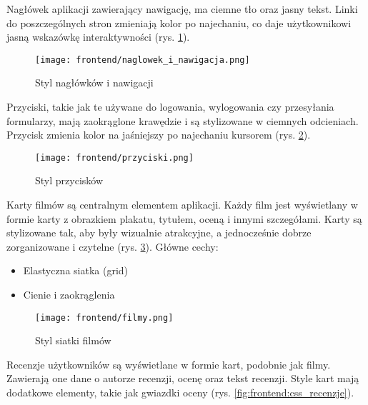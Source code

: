 \documentclass[../main.tex]{subfiles}
\begin{document}

Nagłówek aplikacji zawierający nawigację, ma ciemne tło oraz jasny tekst. Linki do poszczególnych stron zmieniają kolor po najechaniu, co daje użytkownikowi jasną wskazówkę interaktywności (rys. \ref{fig:frontend:css_navbar}).

\begin{figure}[htb]
	\centering
	\texttt{[image: frontend/naglowek\_i\_nawigacja.png]}
	\caption{Styl nagłówków i nawigacji}
	\label{fig:frontend:css_navbar}
\end{figure}


Przyciski, takie jak te używane do logowania, wylogowania czy przesyłania formularzy, mają zaokrąglone krawędzie i są stylizowane w ciemnych odcieniach. Przycisk zmienia kolor na jaśniejszy po najechaniu kursorem (rys. \ref{fig:frontend:css_buttons}).

\begin{figure}[htb]
	\centering
	\texttt{[image: frontend/przyciski.png]}
	\caption{Styl przycisków}
	\label{fig:frontend:css_buttons}
\end{figure}


Karty filmów są centralnym elementem aplikacji. Każdy film jest wyświetlany w formie karty z obrazkiem plakatu, tytułem, oceną i innymi szczegółami. Karty są stylizowane tak, aby były wizualnie atrakcyjne, a jednocześnie dobrze zorganizowane i czytelne (rys. \ref{fig:frontend:css_filmy}).
Główne cechy:
\begin{itemize}
	\item Elastyczna siatka (grid)
	\item Cienie i zaokrąglenia
\end{itemize}

\begin{figure}[htb]
	\centering
	\texttt{[image: frontend/filmy.png]}
	\caption{Styl siatki filmów}
	\label{fig:frontend:css_filmy}
\end{figure}


Recenzje użytkowników są wyświetlane w formie kart, podobnie jak filmy. Zawierają one dane o autorze recenzji, ocenę oraz tekst recenzji. Style kart mają dodatkowe elementy, takie jak gwiazdki oceny (rys. \ref{fig:frontend:css_recenzje}).
\end{document}
